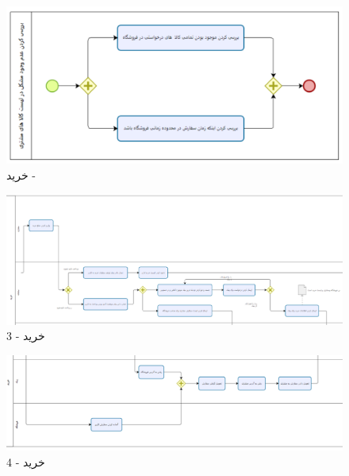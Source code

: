 \documentclass[12pt,a4paper]{article}
\begin{document}
		\pagebreak
		\begin{figure}[h!]
			\begin{center}
				\includegraphics[width=14cm]{images/Bizagi Buy Sub-Process.png}	
			\end{center}
			\caption{خرید - }
		\end{figure}
		\begin{figure}[h!]
			\begin{center}
				\includegraphics[width=14cm]{images/Bizagi Buy 3.png}	
			\end{center}
			\caption{خرید - 3}
		\end{figure}
		\begin{figure}[h!]
			\begin{center}
				\includegraphics[width=14cm]{images/Bizagi Buy 4.png}	
			\end{center}
			\caption{خرید - 4}
		\end{figure}
		\pagebreak
\end{document}
